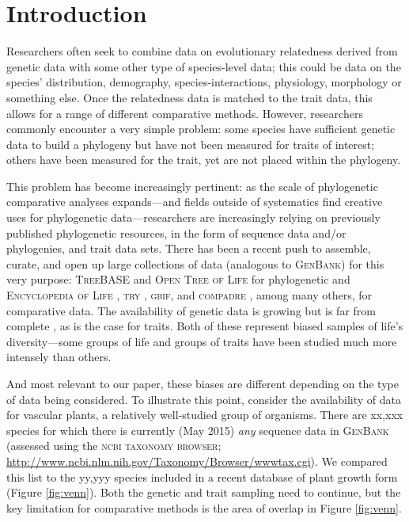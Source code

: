 \documentclass[a4paper,11pt]{article}
\begin{document}
\vfill

\newpage

\section{Introduction}
Researchers often seek to combine data on evolutionary relatedness derived from genetic data with some other type of species-level data; this could be data on the species' distribution, demography, species-interactions, physiology, morphology or something else. Once the relatedness data is matched to the trait data, this allows for a range of different comparative methods. However, researchers commonly encounter a very simple problem: some species have sufficient genetic data to build a phylogeny but have not been measured for traits of interest; others have been measured for the trait, yet are not placed within the phylogeny. 

This problem has become increasingly pertinent: as the scale of phylogenetic comparative analyses expands---and fields outside of systematics find creative uses for phylogenetic data---researchers are increasingly relying on previously published phylogenetic resources, in the form of sequence data and/or phylogenies, and trait data sets. There has been a recent push to assemble, curate, and open up large collections of data (analogous to \textsc{GenBank}) for this very purpose: \textsc{TreeBASE} \citep{treebase} and \textsc{Open Tree of Life} \citep{OpenTree} for phylogenetic and \textsc{Encyclopedia of Life} \citep{eol}, \textsc{try} \citep{try}, \textsc{gbif}, and \textsc{compadre} \citep{salguero2015}, among many others, for comparative data.  The availability of genetic data is growing but is far from complete \citep{hinchliff2014}, as is the case for traits. Both of these represent biased samples of life's diversity---some groups of life and groups of traits have been studied much more intensely than others. 

And most relevant to our paper, these biases are different depending on the type of data being considered. To illustrate this point, consider the availability of data for vascular plants, a relatively well-studied group of organisms. There are xx,xxx species for which there is currently (May 2015) \emph{any} sequence data in \textsc{GenBank} (assessed using the \textsc{ncbi taxonomy browser}; \url{http://www.ncbi.nlm.nih.gov/Taxonomy/Browser/wwwtax.cgi}). We compared this list to the yy,yyy species included in a recent database of plant growth form \citep{Zanne} (Figure \ref{fig:venn}). Both the genetic and trait sampling need to continue, but the key limitation for comparative methods is the area of overlap in Figure \ref{fig:venn}.  
\end{document}
